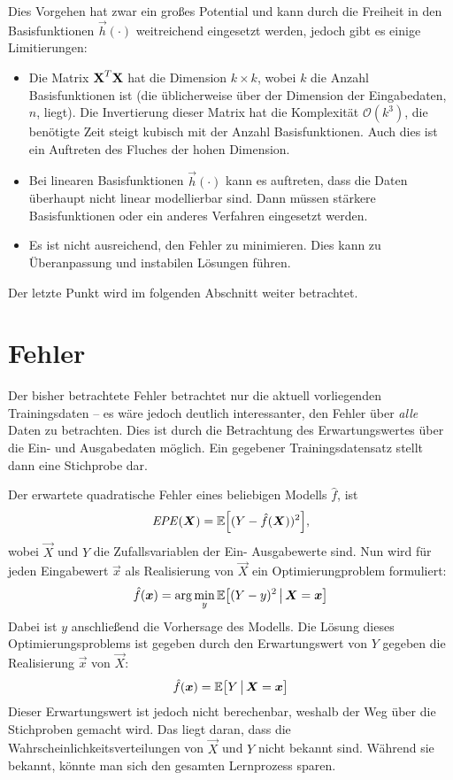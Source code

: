 		Dies Vorgehen hat zwar ein großes Potential und kann durch die Freiheit in den Basisfunktionen \( \vec{h}(\cdot) \) weitreichend eingesetzt werden, jedoch gibt es einige Limitierungen:
		\begin{itemize}
			\item Die Matrix \( \bm{\mathrm{X}}^T \bm{\mathrm{X}} \) hat die Dimension \( k \times k \), wobei \(k\) die Anzahl Basisfunktionen ist (die üblicherweise über der Dimension der Eingabedaten, \(n\), liegt). Die Invertierung dieser Matrix hat die Komplexität \( \mathcal{O}(k^3) \), \dh die benötigte Zeit steigt kubisch mit der Anzahl Basisfunktionen. Auch dies ist ein Auftreten des Fluches der hohen Dimension.
			\item Bei linearen Basisfunktionen \(\vec{h}(\cdot)\) kann es auftreten, dass die Daten überhaupt nicht linear modellierbar sind. Dann müssen stärkere Basisfunktionen oder ein anderes Verfahren eingesetzt werden.
			\item Es ist nicht ausreichend, den Fehler zu minimieren. Dies kann zu Überanpassung und instabilen Lösungen führen.
		\end{itemize}
		Der letzte Punkt wird im folgenden Abschnitt weiter betrachtet.

	\section{Fehler}
		Der bisher betrachtete Fehler betrachtet nur die aktuell vorliegenden Trainingsdaten -- es wäre jedoch deutlich interessanter, den Fehler über \emph{alle} Daten zu betrachten. Dies ist durch die Betrachtung des Erwartungswertes über die Ein- und Ausgabedaten möglich. Ein gegebener Trainingsdatensatz stellt dann eine Stichprobe dar.

		Der erwartete quadratische Fehler eines beliebigen Modells \( \hat{f} \), ist
		\begin{equation}
			\mathit{EPE}(\bm{X}) = \mathbb{E}\Big[ (Y - \hat{f}(\bm{X}))^2 \Big],  \label{eq:rssMean}
		\end{equation}
		wobei \(\vec{X}\) und \(Y\) die Zufallsvariablen der Ein- \bzw Ausgabewerte sind. Nun wird für jeden Eingabewert \(\vec{x}\) als Realisierung von \(\vec{X}\) ein Optimierungproblem formuliert:
		\begin{equation}
			\hat{f}(\bm{x}) = \arg\min_y \mathbb{E}\big[ (Y - y)^2 \,\big\vert\, \bm{X} = \bm{x} \big]
		\end{equation}
		Dabei ist \(y\) anschließend die Vorhersage des Modells. Die Lösung dieses Optimierungsproblems ist gegeben durch den Erwartungswert von \(Y\) gegeben die Realisierung \(\vec{x}\) von \(\vec{X}\):
		\begin{equation}
			\hat{f}(\bm{x}) = \mathbb{E}\big[ Y \,\big\vert\, \bm{X} = \bm{x} \big]
		\end{equation}
		Dieser Erwartungswert ist jedoch \iA nicht berechenbar, weshalb der Weg über die Stichproben gemacht wird. Das liegt daran, dass die Wahrscheinlichkeitsverteilungen von \(\vec{X}\) und \(Y\) nicht bekannt sind. Während sie bekannt, könnte man sich den gesamten Lernprozess sparen.

